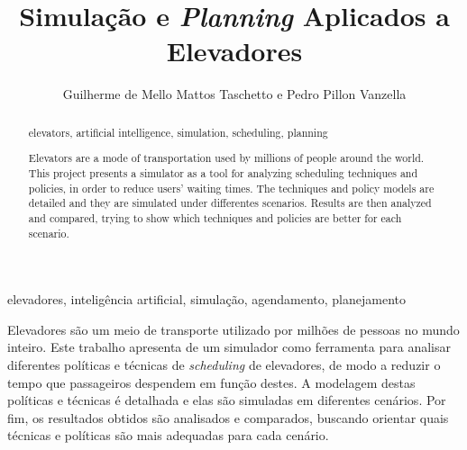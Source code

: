 \documentclass[portuguese,oneside]{tcc}
\author{Guilherme de Mello Mattos Taschetto e Pedro Pillon Vanzella}
\title{Simulação e \textit{Planning} Aplicados a Elevadores}
      {Simulation and Planning Applied to Elevators}
\begin{document}
\begin{resumo}{elevadores, inteligência artificial, simulação, agendamento, planejamento}

Elevadores são um meio de transporte utilizado por milhões de pessoas no mundo
inteiro. Este trabalho apresenta de um simulador como ferramenta para analisar
diferentes políticas e técnicas de \textit{scheduling} de elevadores, de modo a
reduzir o tempo que passageiros despendem em função destes. A modelagem destas
políticas e técnicas é detalhada e elas são simuladas em diferentes cenários.
Por fim, os resultados obtidos são analisados e comparados, buscando orientar
quais técnicas e políticas são mais adequadas para cada cenário.

\end{resumo}

\begin{abstract}{elevators, artificial intelligence, simulation, scheduling, planning}

Elevators are a mode of transportation used by millions of people around the
world. This project presents a simulator as a tool for analyzing  scheduling
techniques and policies, in order to reduce users' waiting times. The techniques
and policy models are detailed and they are simulated under differentes
scenarios. Results are then analyzed and compared, trying to show which
techniques and policies are better for each scenario.

\end{abstract}

\listoffigures
\listofalgorithms
\listoftables
\tableofcontents












\end{document}
